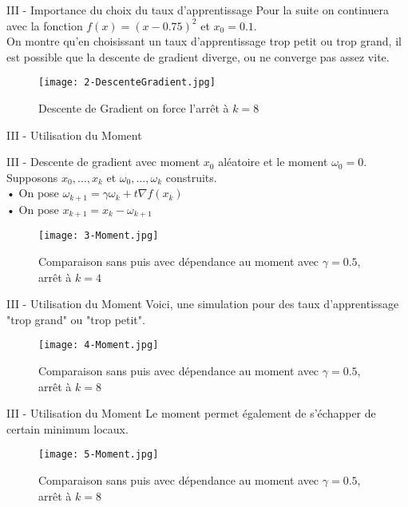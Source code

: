 \documentclass[10pt]{beamer}
\begin{document}
\begin{frame}{III - Importance du choix du taux d'apprentissage}
Pour la suite on continuera avec la fonction $f(x) = (x-0.75)^2$ et $x_0=0.1$. \\
On montre qu'en choisissant un taux d'apprentissage trop petit ou trop grand, il est possible que la descente de gradient diverge, ou ne converge pas assez vite.
\begin{figure}
	\centering
    \texttt{[image: 2-DescenteGradient.jpg]}
	\caption{Descente de Gradient on force l'arrêt à $k=8$}
\end{figure}
\end{frame}

\begin{frame}{III - Utilisation du Moment}
\begin{block}{III - Descente de gradient avec moment}
$x_0$ aléatoire et le moment $\omega_0 = 0$.
Supposons $x_0, \ldots, x_k$ et $\omega_0, \ldots, \omega_k$ construits. \\
    • On pose $\omega_{k+1} = \gamma \omega_k + t \nabla f(x_k)$ \\
    • On pose $x_{k+1} = x_k - \omega_{k+1}$ 
\end{block}
\begin{figure}
	\centering
    \texttt{[image: 3-Moment.jpg]}
	\caption{Comparaison sans puis avec dépendance au moment avec $\gamma = 0.5$, arrêt à $k=4$}
\end{figure}
\end{frame}

\begin{frame}{III - Utilisation du Moment}
Voici, une simulation pour des taux d'apprentissage "trop grand" ou "trop petit".
\begin{figure}
	\centering
    \texttt{[image: 4-Moment.jpg]}
	\caption{Comparaison sans puis avec dépendance au moment avec $\gamma = 0.5$, arrêt à $k=8$}
\end{figure}
\end{frame}

\begin{frame}{III - Utilisation du Moment}
Le moment permet également de s'échapper de certain minimum locaux.
\begin{figure}
	\centering
    \texttt{[image: 5-Moment.jpg]}
	\caption{Comparaison sans puis avec dépendance au moment avec $\gamma = 0.5$, arrêt à $k=8$}
\end{figure}
\end{frame}
\end{document}
